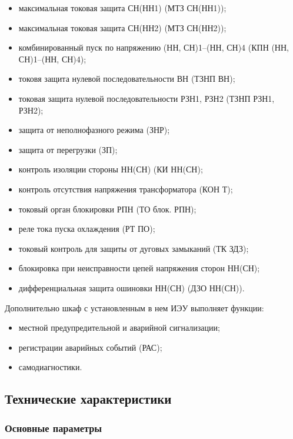 \begin{enumsub}
\begin{itemize}
  \item максимальная токовая защита СН(НН1) (МТЗ СН(НН1));
  \item максимальная токовая защита СН(НН2) (МТЗ СН(НН2));
  \item комбинированный пуск по напряжению (НН, СН)1--(НН, СН)4 (КПН (НН, СН)1--(НН, СН)4);
  \item токовя защита нулевой последовательности ВН (ТЗНП ВН);
  \item токовая защита нулевой последовательности РЗН1, РЗН2 (ТЗНП РЗН1, РЗН2);
  \item защита от неполнофазного режима (ЗНР);
  \item защита от перегрузки (ЗП);
  \item контроль изоляции стороны НН(СН) (КИ НН(СН);
  \item контроль отсутствия напряжения трансформатора (КОН Т);
  \item токовый орган блокировки РПН (ТО блок. РПН);
  \item реле тока пуска охлаждения (РТ ПО);
  \item токовый контроль для защиты от дуговых замыканий (ТК ЗДЗ);
  \item блокировка при неисправности цепей напряжения сторон НН(СН);
  \item дифференциальная защита ошиновки НН(СН) (ДЗО НН(СН)).
  \end{itemize}
\item Дополнительно шкаф с установленным в нем ИЭУ выполняет функции:
  \begin{itemize}
  \item местной предупредительной и аварийной сигнализации;
  \item регистрации аварийных событий (РАС);
  \item самодиагностики.
  \end{itemize}
\end{enumsub}

{\color{unidarkgreen}\subsection{Технические характеристики}}

\subsubsection{Основные параметры}

